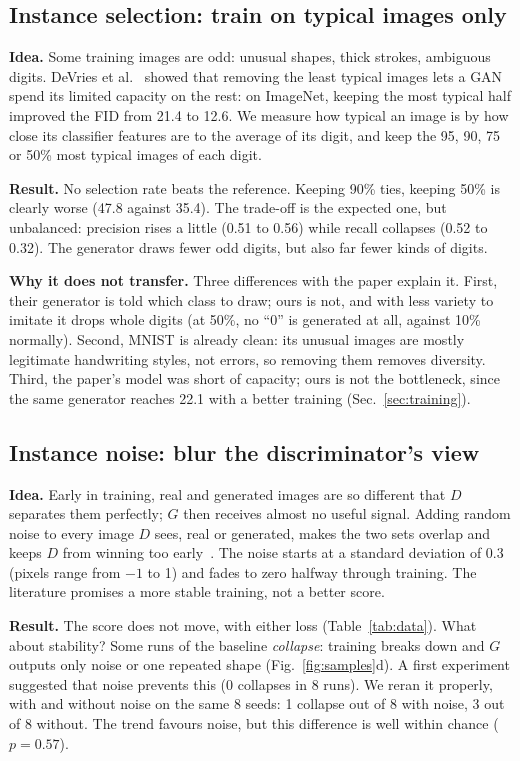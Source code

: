 \subsection{Instance selection: train on typical images only}

\textbf{Idea.} Some training images are odd: unusual shapes, thick strokes, ambiguous digits. DeVries et
al.~\cite{devries2020} showed that removing the least typical images lets a GAN spend its limited capacity on the rest: on
ImageNet, keeping the most typical half improved the FID from 21.4 to 12.6. We measure how typical an image is by how
close its classifier features are to the average of its digit, and keep the 95, 90, 75 or 50\% most typical images of
each digit.

\textbf{Result.} No selection rate beats the reference. Keeping 90\% ties, keeping 50\% is clearly worse (47.8 against
35.4). The trade-off is the expected one, but unbalanced: precision rises a little (0.51 to 0.56) while recall collapses
(0.52 to 0.32). The generator draws fewer odd digits, but also far fewer kinds of digits.

\textbf{Why it does not transfer.} Three differences with the paper explain it. First, their generator is told which
class to draw; ours is not, and with less variety to imitate it drops whole digits (at 50\%, no ``0'' is generated at
all, against 10\% normally). Second, MNIST is already clean: its unusual images are mostly legitimate handwriting styles,
not errors, so removing them removes diversity. Third, the paper's model was short of capacity; ours is not the
bottleneck, since the same generator reaches 22.1 with a better training (Sec.~\ref{sec:training}).

\subsection{Instance noise: blur the discriminator's view}

\textbf{Idea.} Early in training, real and generated images are so different that $D$ separates them perfectly; $G$
then receives almost no useful signal. Adding random noise to every image $D$ sees, real or generated, makes the two sets
overlap and keeps $D$ from winning too early~\cite{sonderby2017,arjovsky2017}. The noise starts at a standard deviation
of 0.3 (pixels range from $-1$ to 1) and fades to zero halfway through training. The literature promises a more stable
training, not a better score.

\textbf{Result.} The score does not move, with either loss (Table~\ref{tab:data}). What about stability? Some runs
of the baseline \emph{collapse}: training breaks down and $G$ outputs only noise or one repeated shape
(Fig.~\ref{fig:samples}d). A first experiment suggested that noise prevents this (0 collapses in 8 runs). We reran it
properly, with and without noise on the same 8 seeds: 1 collapse out of 8 with noise, 3 out of 8 without. The trend
favours noise, but this difference is well within chance ($p=0.57$).


